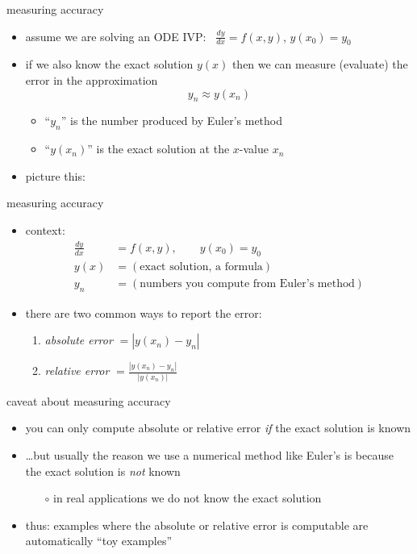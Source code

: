 \documentclass[colorlinks]{beamer}
\newcommand{\ds}{\displaystyle}
\begin{document}
\begin{frame}{measuring accuracy}

\begin{itemize}
\item assume we are solving an ODE IVP:  \, $\frac{dy}{dx} = f(x,y)$, $y(x_0)=y_0$
\item if we \alert{also know the exact solution $y(x)$} then we can measure (evaluate) the error in the approximation
    $$y_n \approx y(x_n)$$
    \vspace{-4mm}
    \begin{itemize}
    \item ``$y_n$'' is the number produced by Euler's method
    \item ``$y(x_n)$'' is the exact solution at the $x$-value $x_n$
    \end{itemize}
\item picture this:
\end{itemize}

\vspace{25mm}
\end{frame}


\begin{frame}{measuring accuracy}

\begin{itemize}
\item context:
\begin{align*}
\frac{dy}{dx} &= f(x,y), \qquad y(x_0)=y_0 \\
y(x) &= (\text{exact solution, a formula}) \\
y_n &= (\text{numbers you compute from Euler's method})
\end{align*}
\item there are two common ways to report the error:
    \begin{enumerate}
    \medskip
    \item \emph{absolute error} $=|y(x_n) - y_n|$
    
    \medskip
    \item \emph{relative error} $\ds=\frac{|y(x_n) - y_n|}{|y(x_n)|}$
    \end{enumerate}
\end{itemize}
\end{frame}


\begin{frame}{caveat about measuring accuracy}

\begin{itemize}
\item you can only compute absolute or relative error \emph{if} the exact solution is known
\item \dots but usually the reason we use a numerical method like Euler's is because the exact solution is \emph{not} known
    \begin{itemize}
    \item[$\circ$] in real applications we do not know the exact solution
    \end{itemize}
\item thus: \alert{examples where the absolute or relative error is computable are automatically ``toy examples''}
\end{itemize}
\end{frame}
\end{document}
